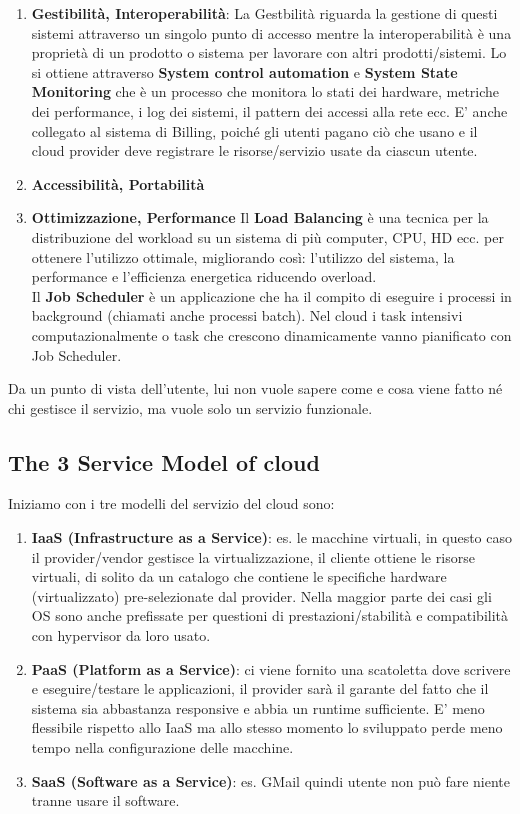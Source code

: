 \documentclass[11pt, twocolumn]{article}
\begin{document}
\begin{enumerate}[noitemsep, topsep=0ex, leftmargin=*]
	\item \textbf{Gestibilità, Interoperabilità}:
	La Gestbilità riguarda la gestione di questi sistemi attraverso un singolo punto di accesso mentre la interoperabilità è una proprietà di un prodotto o sistema per lavorare con altri prodotti/sistemi.
	Lo si ottiene attraverso \textbf{System control automation} e \textbf{System State Monitoring} che è un processo che monitora lo stati dei hardware, metriche dei performance, i log dei sistemi, il pattern dei accessi alla rete ecc.
	E' anche collegato al sistema di Billing, poiché gli utenti pagano ciò che usano e il cloud provider deve registrare le risorse/servizio usate da ciascun utente.\\
	\item \textbf{Accessibilità, Portabilità}
	
	\item \textbf{Ottimizzazione, Performance}
	Il \textbf{Load Balancing} è una tecnica per la distribuzione del workload su un sistema di più computer, CPU, HD ecc. per ottenere l'utilizzo ottimale, migliorando così: l'utilizzo del sistema, la performance e l'efficienza energetica riducendo overload.\\
	Il \textbf{Job Scheduler} è un applicazione che ha il compito di eseguire i processi in background (chiamati anche processi batch).
	Nel cloud i task intensivi computazionalmente o task che crescono dinamicamente vanno pianificato con Job Scheduler.
\end{enumerate}
Da un punto di vista dell'utente, lui non vuole sapere come e cosa viene fatto né chi gestisce il servizio, ma vuole solo un servizio funzionale.

\subsection{The 3 Service Model of cloud}
Iniziamo con i tre modelli del servizio del cloud sono:
\begin{enumerate}[wide, topsep=0ex, noitemsep]
	\item \textbf{IaaS (Infrastructure as a Service)}: es. le macchine virtuali, in questo caso il provider/vendor gestisce la virtualizzazione, il cliente ottiene le risorse virtuali, di solito da un catalogo che contiene le specifiche hardware (virtualizzato) pre-selezionate dal provider. Nella maggior parte dei casi gli OS sono anche prefissate per questioni di prestazioni/stabilità e compatibilità con hypervisor da loro usato.
	\item \textbf{PaaS (Platform as a Service)}: ci viene fornito una scatoletta dove scrivere e eseguire/testare le applicazioni, il provider sarà il garante del fatto che il sistema sia abbastanza responsive e abbia un runtime sufficiente. E' meno flessibile rispetto allo IaaS ma allo stesso momento lo sviluppato perde meno tempo nella configurazione delle macchine.
	\item \textbf{SaaS (Software as a Service)}: es. GMail quindi utente non può fare niente tranne usare il software.
\end{enumerate}
\end{document}
